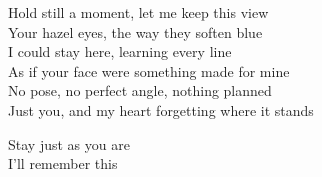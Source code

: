 \begin{lyrics}
Hold still a moment, let me keep this view\\
Your hazel eyes, the way they soften blue\\
I could stay here, learning every line\\
As if your face were something made for mine\\
No pose, no perfect angle, nothing planned\\
Just you, and my heart forgetting where it stands

Stay just as you are\\
I’ll remember this
\end{lyrics}

